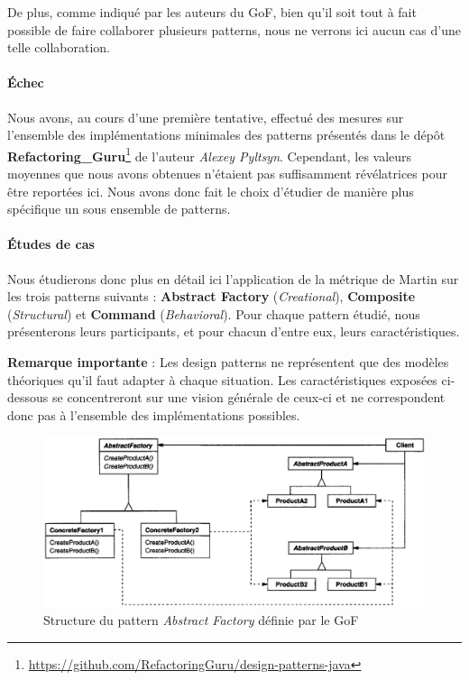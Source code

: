 \documentclass{scrartcl}
\begin{document}
    De plus, comme indiqué par les auteurs du GoF, bien qu'il soit tout à fait possible de faire collaborer plusieurs patterns, nous ne verrons ici aucun cas d'une telle collaboration.
    
    \paragraph{Échec}Nous avons, au cours d'une première tentative, effectué des mesures sur l'ensemble des implémentations minimales des patterns présentés dans le dépôt \textbf{Refactoring\_Guru}\footnote{\url{https://github.com/RefactoringGuru/design-patterns-java}} de l'auteur \emph{Alexey Pyltsyn}. Cependant, les valeurs moyennes que nous avons obtenues n'étaient pas suffisamment révélatrices pour être reportées ici. Nous avons donc fait le choix d'étudier de manière plus spécifique un sous ensemble de patterns.

    \paragraph{Études de cas}Nous étudierons donc plus en détail ici l'application de la métrique de Martin sur les trois patterns suivants : \textbf{Abstract Factory} (\emph{Creational}), \textbf{Composite} (\emph{Structural}) et \textbf{Command} (\emph{Behavioral}). Pour chaque pattern étudié, nous présenterons leurs participants, et pour chacun d'entre eux, leurs caractéristiques.

    \textbf{Remarque importante} : Les design patterns ne représentent que des modèles théoriques qu'il faut adapter à chaque situation. Les caractéristiques exposées ci-dessous se concentreront sur une vision générale de ceux-ci et ne correspondent donc pas à l'ensemble des implémentations possibles.
    
    \bigbreak
    \begin{figure}[H]
        \centering
        \includegraphics[scale=0.35]{img/pattern/abstract_factory.png}
        \caption{Structure du pattern \emph{Abstract Factory} définie par le GoF}
    \end{figure}
\end{document}

